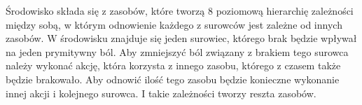 Środowisko składa się z zasobów, które tworzą 8 poziomową hierarchię zależności 
między sobą, w którym odnowienie każdego z surowców jest zależne od innych 
zasobów. W środowisku znajduje się jeden surowiec, którego brak będzie wpływał 
na jeden prymitywny ból. Aby zmniejszyć ból związany z brakiem tego surowca 
należy wykonać akcję, która korzysta z innego zasobu, którego z czasem także 
będzie brakowało. Aby odnowić ilość tego zasobu będzie konieczne wykonanie 
innej akcji i kolejnego surowca. I takie zależności tworzy reszta zasobów.

